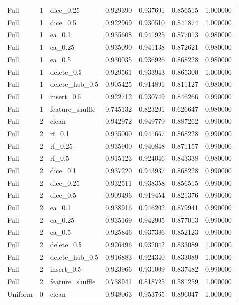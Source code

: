 \documentclass[UTF8,a4paper,11pt,fontset=fandol]{ctexart}
\begin{document}
{\begin{longtable}{lrlrrrr}
Full & 1 & dice\_0.25 & 0.929390 & 0.937691 & 0.856515 & 1.000000 \\
Full & 1 & dice\_0.5 & 0.922969 & 0.930510 & 0.841874 & 1.000000 \\
Full & 1 & ea\_0.1 & 0.935608 & 0.941925 & 0.877013 & 0.980000 \\
Full & 1 & ea\_0.25 & 0.935090 & 0.941138 & 0.872621 & 0.980000 \\
Full & 1 & ea\_0.5 & 0.930035 & 0.936926 & 0.868228 & 0.980000 \\
Full & 1 & delete\_0.5 & 0.929561 & 0.933943 & 0.865300 & 1.000000 \\
Full & 1 & delete\_hub\_0.5 & 0.905425 & 0.914891 & 0.811127 & 0.980000 \\
Full & 1 & insert\_0.5 & 0.922712 & 0.930749 & 0.846266 & 0.990000 \\
Full & 1 & feature\_shuffle & 0.745132 & 0.823201 & 0.626647 & 0.980000 \\
Full & 2 & clean & 0.942972 & 0.949779 & 0.887262 & 0.990000 \\
Full & 2 & rf\_0.1 & 0.935000 & 0.941667 & 0.868228 & 0.990000 \\
Full & 2 & rf\_0.25 & 0.935900 & 0.940848 & 0.871157 & 0.990000 \\
Full & 2 & rf\_0.5 & 0.915123 & 0.924046 & 0.843338 & 0.980000 \\
Full & 2 & dice\_0.1 & 0.937220 & 0.943937 & 0.868228 & 0.990000 \\
Full & 2 & dice\_0.25 & 0.932511 & 0.938358 & 0.856515 & 0.990000 \\
Full & 2 & dice\_0.5 & 0.909496 & 0.919454 & 0.821376 & 0.990000 \\
Full & 2 & ea\_0.1 & 0.938916 & 0.946202 & 0.879941 & 0.990000 \\
Full & 2 & ea\_0.25 & 0.935169 & 0.942905 & 0.877013 & 0.990000 \\
Full & 2 & ea\_0.5 & 0.925846 & 0.937386 & 0.852123 & 0.990000 \\
Full & 2 & delete\_0.5 & 0.926496 & 0.932042 & 0.833089 & 1.000000 \\
Full & 2 & delete\_hub\_0.5 & 0.916883 & 0.924340 & 0.833089 & 1.000000 \\
Full & 2 & insert\_0.5 & 0.923966 & 0.931009 & 0.837482 & 0.990000 \\
Full & 2 & feature\_shuffle & 0.738941 & 0.818725 & 0.581259 & 1.000000 \\
Uniform & 0 & clean & 0.948063 & 0.953765 & 0.896047 & 1.000000 \\

\end{longtable}}
\end{document}
